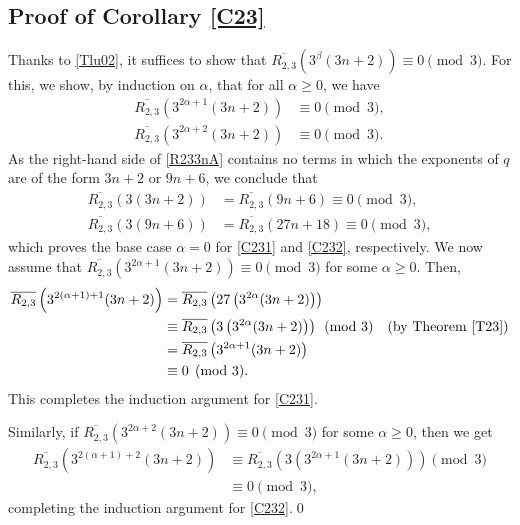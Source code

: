 \documentclass{amsart}
\theoremstyle{definition}
\begin{document}
\subsection*{Proof of Corollary \ref{C23}}
Thanks to \eqref{Tlu02}, it
suffices to show that $\overline{R_{2,3}}\left(3^\beta(3n+2)\right)\equiv0\pmod{3}$.   For this, we show, by induction on $\alpha$, that for all $\alpha\geq0$, we have 
 \begin{align}
 \label{C231}\overline{R_{2,3}}\left(3^{2\alpha+1}(3n+2)\right)&\equiv0\pmod{3},\\
 \label{C232}\overline{R_{2,3}}\left(3^{2\alpha+2}(3n+2)\right)&\equiv0\pmod{3}.
 \end{align}
 As the right-hand side of \eqref{R233nA} contains no terms in which the exponents of $q$ are of the form $3n+2$ or $9n+6$, we conclude that  \begin{align*}\overline{R_{2,3}}\left(3(3n+2)\right)&=\overline{R_{2,3}}(9n+6)\equiv0\pmod{3},\\
 \overline{R_{2,3}}\left(3(9n+6)\right)&=\overline{R_{2,3}}(27n+18)\equiv0\pmod{3},
 \end{align*}
    which proves the base case $\alpha=0$ for \eqref{C231} and \eqref{C232}, respectively. We now assume that 
$\overline{R_{2,3}}\left(3^{2\alpha+1}(3n+2)\right)\equiv0\pmod{3}$ for some $\alpha\geq0$. Then,
\begin{align*}
    \overline{R_{2,3}}\left(3^{2(\alpha+1)+1}(3n+2)\right)&=\overline{R_{2,3}}\left(27 
   \left(3^{2\alpha}(3n+2)\right)\right)\\
    &\equiv \overline{R_{2,3}}\left(3 
   \left(3^{2\alpha}(3n+2)\right)\right) \pmod{3} \quad (\text{by Theorem \ref{T23}})\\
   &=\overline{R_{2,3}}
   \left(3^{2\alpha+1}(3n+2)\right)\\
   &\equiv0\pmod{3}.
\end{align*}
This completes the induction argument for \eqref{C231}.

Similarly, if $\overline{R_{2,3}}\left(3^{2\alpha+2}(3n+2)\right)\equiv0\pmod{3}$ for some $\alpha\geq0$, then we get 
\begin{align*}
    \overline{R_{2,3}}\left(3^{2(\alpha+1)+2}(3n+2)\right)&\equiv \overline{R_{2,3}}\left(3 
   \left(3^{2\alpha+1}(3n+2)\right)\right) \pmod{3}\\
   &\equiv0\pmod{3},
\end{align*}
completing the induction argument for \eqref{C232}.\qed
\end{document}
